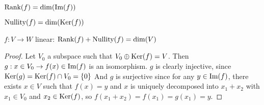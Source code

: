 \begin{definition}
	$\text{Rank}(f)=\dim(\text{Im}(f))$
\end{definition}
\begin{definition}
	$\text{Nullity}(f)=\dim(\text{Ker}(f))$
\end{definition}
\begin{theorem}
	$f:V \to W$ linear: $\text{Rank}(f)+\text{Nullity}(f)=\dim(V)$
\end{theorem}
\begin{proof}
	Let $V_0$ a subspace such that $V_0 \oplus \text{Ker}(f) = V$.
	Then $g:x \in V_0 \to f(x) \in \text{Im}(f)$ is an isomorphism.
	$g$ is clearly injective, since $\text{Ker}(g)=\text{Ker}(f) \cap V_0 = \{0\}$
	And $g$ is surjective since for any $y \in \text{Im}(f)$, there exists $x \in V$ such that $f(x)=y$ and $x$ is uniquely decomposed into $x_1 + x_2$ with $x_1 \in V_0$ and $x_2 \in \text{Ker}(f)$, so $f(x_1+x_2)=f(x_1)=g(x_1)=y$.

\end{proof}





